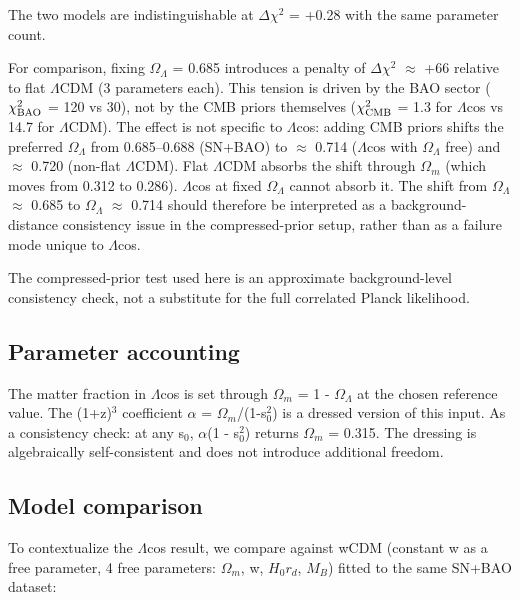 The two models are indistinguishable at $\Delta\chi^2$ = +0.28 with the same
parameter count.

For comparison, fixing $\Omega_\Lambda$ = 0.685 introduces a penalty of $\Delta\chi^2$ $\approx$ +66
relative to flat $\Lambda$CDM (3 parameters each). This tension is driven by the
BAO sector ($\chi^2_{\rm BAO}$ = 120 vs 30), not by the CMB priors themselves
($\chi^2_{\rm CMB}$ = 1.3 for $\Lambda$cos vs 14.7 for $\Lambda$CDM). The effect is not specific to
$\Lambda$cos: adding CMB priors shifts the preferred $\Omega_\Lambda$ from 0.685--0.688
(SN+BAO) to $\approx$ 0.714 ($\Lambda$cos with $\Omega_\Lambda$ free) and $\approx$ 0.720 (non-flat $\Lambda$CDM).
Flat $\Lambda$CDM absorbs the shift through $\Omega_m$ (which moves from 0.312 to
0.286). $\Lambda$cos at fixed $\Omega_\Lambda$ cannot absorb it. The shift from $\Omega_\Lambda$ $\approx$ 0.685
to $\Omega_\Lambda$ $\approx$ 0.714 should therefore be interpreted as a background-distance
consistency issue in the compressed-prior setup, rather than as a
failure mode unique to $\Lambda$cos.

The compressed-prior test used here is an approximate background-level
consistency check, not a substitute for the full correlated Planck
likelihood.

\subsection{Parameter accounting}\label{sec:param-accounting}

The matter fraction in $\Lambda$cos is set through $\Omega_m$ = 1 - $\Omega_\Lambda$ at the chosen
reference value. The (1+z)$^3$ coefficient $\alpha$ = $\Omega_m$/(1-s$_0^2$) is a dressed
version of this input. As a consistency check: at any s$_0$, $\alpha$(1 - s$_0^2$)
returns $\Omega_m$ = 0.315. The dressing is algebraically self-consistent and
does not introduce additional freedom.

\subsection{Model comparison}\label{sec:model-comparison}

To contextualize the $\Lambda$cos result, we compare against wCDM (constant w as
a free parameter, 4 free parameters: $\Omega_m$, w, $H_0 r_d$, $M_B$) fitted to
the same SN+BAO dataset:

